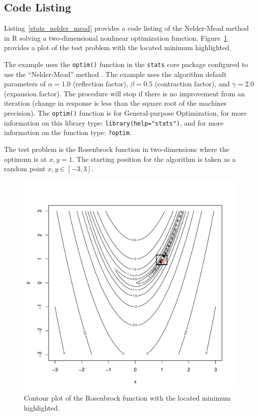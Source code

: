 \subsection{Code Listing}
Listing~\ref{stats_nelder_mead} provides a code listing of the Nelder-Mead method in R solving a two-dimensional nonlinear optimization function. Figure~\ref{plot:nelder_mead_result} provides a plot of the test problem with the located minimum highlighted.

The example uses the \texttt{optim()} function in the \texttt{stats} core package configured to use the ``Nelder-Mead'' method \cite{RDevelopmentCoreTeam2011a}. The example uses the algorithm default parameters of $\alpha=1.0$ (reflection factor), $\beta=0.5$ (contraction factor), and $\gamma=2.0$ (expansion factor). The procedure will stop if there is no improvement from an iteration (change in response is less than the square root of the machines precision). The \texttt{optim()} function is for General-purpose Optimization, for more information on this library type: \texttt{library(help="stats")}, and for more information on the function type: \texttt{?optim}.

The test problem is the Rosenbrock function in two-dimensions where the optimum is at $x,y=1$. The starting position for the algorithm is taken as a random point $x,y \in [-3,3]$.



\begin{figure}[htp]
\centering
\includegraphics[scale=0.45]{a_optimization/nelder_mead_result.pdf}
\caption{Contour plot of the Rosenbrock function with the located minimum highlighted.}
\label{plot:nelder_mead_result}
\end{figure}


